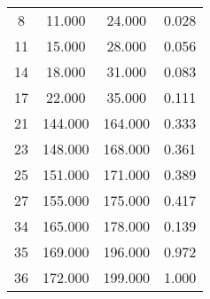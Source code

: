 % 
\begin{tabular}{cccc}
  \hline
  \hline
8 & 11.000 & 24.000 & 0.028 \\ 
  11 & 15.000 & 28.000 & 0.056 \\ 
  14 & 18.000 & 31.000 & 0.083 \\ 
  17 & 22.000 & 35.000 & 0.111 \\ 
  21 & 144.000 & 164.000 & 0.333 \\ 
  23 & 148.000 & 168.000 & 0.361 \\ 
  25 & 151.000 & 171.000 & 0.389 \\ 
  27 & 155.000 & 175.000 & 0.417 \\ 
  34 & 165.000 & 178.000 & 0.139 \\ 
  35 & 169.000 & 196.000 & 0.972 \\ 
  36 & 172.000 & 199.000 & 1.000 \\ 
   \hline
\end{tabular}
